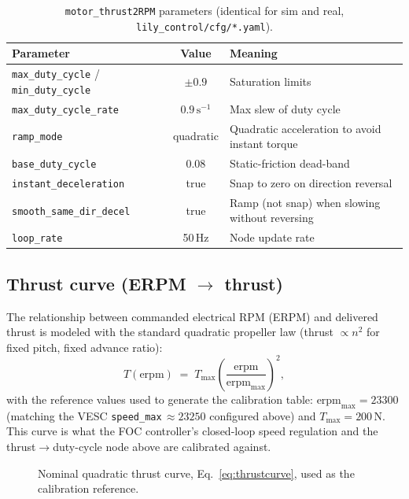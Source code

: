 \begin{table}[H]
\centering
\caption{\texttt{motor\_thrust2RPM} parameters (identical for sim and real, \texttt{lily\_control/cfg/*.yaml}).}
\label{tab:t2rpm}
\begin{tabular}{@{}lcl@{}}
\toprule
Parameter & Value & Meaning \\
\midrule
\texttt{max\_duty\_cycle} / \texttt{min\_duty\_cycle} & $\pm 0.9$ & Saturation limits \\
\texttt{max\_duty\_cycle\_rate} & $0.9\,\text{s}^{-1}$ & Max slew of duty cycle \\
\texttt{ramp\_mode} & quadratic & Quadratic acceleration to avoid instant torque \\
\texttt{base\_duty\_cycle} & 0.08 & Static-friction dead-band \\
\texttt{instant\_deceleration} & true & Snap to zero on direction reversal \\
\texttt{smooth\_same\_dir\_decel} & true & Ramp (not snap) when slowing without reversing \\
\texttt{loop\_rate} & 50\,Hz & Node update rate \\
\bottomrule
\end{tabular}
\end{table}

\subsection{Thrust curve (ERPM $\rightarrow$ thrust)}
\label{sec:thrustcurve}

The relationship between commanded electrical RPM (ERPM) and delivered thrust is modeled with the standard quadratic propeller law (thrust $\propto n^2$ for fixed pitch, fixed advance ratio):
\begin{equation}
T(\text{erpm}) \;=\; T_{\max}\left(\frac{\text{erpm}}{\text{erpm}_{\max}}\right)^{2},
\label{eq:thrustcurve}
\end{equation}
with the reference values used to generate the calibration table: $\text{erpm}_{\max}=23300$ (matching the VESC \texttt{speed\_max}$\,\approx 23250$ configured above) and $T_{\max}=200\,\text{N}$. This curve is what the FOC controller's closed-loop speed regulation and the thrust$\to$duty-cycle node above are calibrated against.

\begin{figure}[H]
\centering
{}
\caption{Nominal quadratic thrust curve, Eq.~\eqref{eq:thrustcurve}, used as the calibration reference.}
\label{fig:thrustcurve}
\end{figure}

